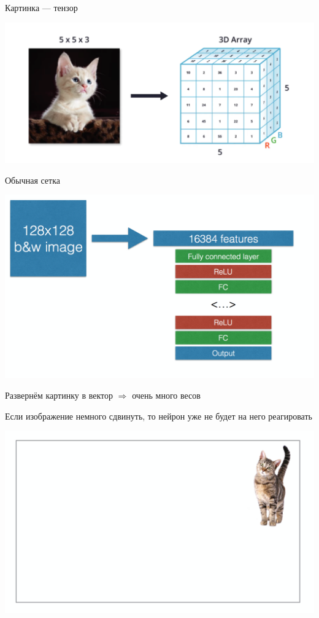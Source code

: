 \documentclass[notes,12pt, aspectratio=169]{beamer}
\newenvironment{wideitemize}{\itemize\addtolength{\itemsep}{10pt}}{\enditemize}
\begin{document}
\begin{frame}{Картинка — тензор}
\begin{center}
	\includegraphics[width=.8\linewidth]{cat_cube.png}
\end{center}
\end{frame}


\begin{frame}{Обычная сетка}
\begin{center}
	\includegraphics[width=.55\linewidth]{not_conv.png}
\end{center}

\begin{wideitemize}
	\item Развернём картинку в вектор $\Rightarrow$  \alert{очень много весов} 
	\item Если изображение немного сдвинуть, то нейрон уже не будет на него реагировать
\end{wideitemize}
\end{frame}


\begin{frame}
\begin{center}
	\includegraphics[width=.7\linewidth]{cat_1.png}
\end{center}
\end{frame}
\end{document}
